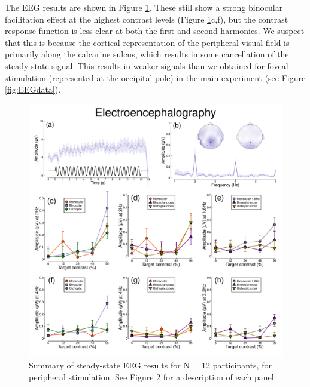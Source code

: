 \documentclass[
]{article}
\begin{document}
The EEG results are shown in Figure \ref{fig:appendixfig2}. These still show a strong binocular facilitation effect at the highest contrast levels (Figure \ref{fig:appendixfig2}c,f), but the contrast response function is less clear at both the first and second harmonics. We suspect that this is because the cortical representation of the peripheral visual field is primarily along the calcarine sulcus, which results in some cancellation of the steady-state signal. This results in weaker signals than we obtained for foveal stimulation (represented at the occipital pole) in the main experiment (see Figure \ref{fig:EEGdata}).

\begin{figure}

{\centering \includegraphics{Figures/EEGdataRep} 

}

\caption{Summary of steady-state EEG results for N = 12 participants, for peripheral stimulation. See Figure 2 for a description of each panel.}\label{fig:appendixfig2}
\end{figure}
\end{document}
